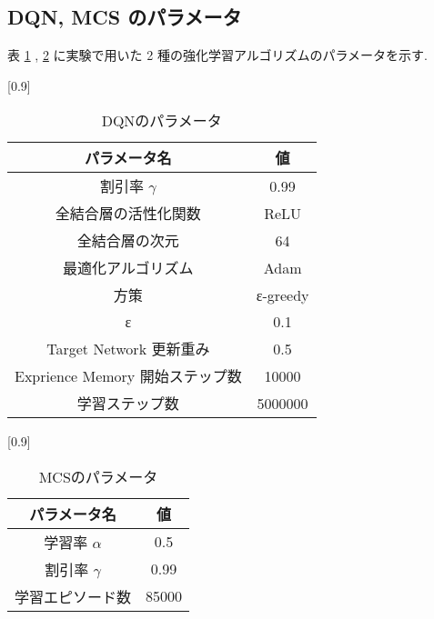\documentclass[twocolumn]{jarticle}     %
\begin{document}
  \subsection{DQN, MCS のパラメータ}
  表 \ref{table:dqnparam} , \ref{table:mcsparam} に実験で用いた 2 種の強化学習アルゴリズムのパラメータを示す.
  \begin{table}[H]
    \centering
    \caption{DQNのパラメータ}
    \label{table:dqnparam}
    \scalebox{0.9}[0.9]{
      \begin{tabular}{|c|c|}
        \hline
        パラメータ名 & 値 \\ \hline \hline
        割引率 $\gamma$ & 0.99 \\ \hline     
        全結合層の活性化関数             & ReLU     \\ \hline
        全結合層の次元                & 64       \\ \hline
        最適化アルゴリズム              & Adam     \\ \hline
        方策                 & ε-greedy \\ \hline
        ε & 0.1 \\ \hline  
        Target Network 更新重み              & 0.5     \\ \hline
        Exprience Memory 開始ステップ数 & 10000 \\ \hline
        学習ステップ数 & 5000000 \\ \hline
        \end{tabular}
    }
    \end{table}
  
    \begin{table}[H]
      \centering
      \caption{MCSのパラメータ}
      \label{table:mcsparam}
      \scalebox{0.9}[0.9]{
        \begin{tabular}{|c|c|}
          \hline
          パラメータ名 & 値 \\ \hline \hline
          学習率 $\alpha$ & 0.5 \\ \hline
          割引率 $\gamma$ & 0.99 \\ \hline     
          学習エピソード数 & 85000 \\ \hline
    
          \end{tabular}
      }
      \end{table}
\end{document}
